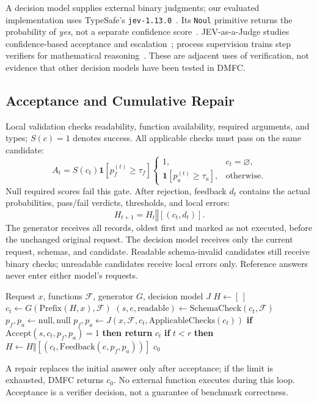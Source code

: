 A decision model supplies external binary judgments; our evaluated implementation uses TypeSafe's \texttt{jev-1.13.0}~\cite{typesafe2026models}. Its \texttt{Noul} primitive returns the probability of \emph{yes}, not a separate confidence score~\cite{typesafe2026noul,typesafe2026confidence}. JEV-as-a-Judge studies confidence-based acceptance and escalation~\cite{li2026jevjudge}; process supervision trains step verifiers for mathematical reasoning~\cite{lightman2023verify}. These are adjacent uses of verification, not evidence that other decision models have been tested in DMFC.

\subsection{Acceptance and Cumulative Repair}
Local validation checks readability, function availability, required arguments, and types; $S(c)=1$ denotes success. All applicable checks must pass on the same candidate:
\begin{equation}
A_t=S(c_t)\mathbf{1}[p_f^{(t)}\geq\tau_f]
\begin{cases}
1,&c_t=\varnothing,\\
\mathbf{1}[p_a^{(t)}\geq\tau_a],&\text{otherwise}.
\end{cases}
\label{eq:gate}
\end{equation}
Null required scores fail this gate. After rejection, feedback $d_t$ contains the actual probabilities, pass/fail verdicts, thresholds, and local errors:
\begin{equation}
H_{t+1}=H_t\mathbin{\Vert}[(c_t,d_t)].
\end{equation}
The generator receives all records, oldest first and marked as not executed, before the unchanged original request. The decision model receives only the current request, schemas, and candidate. Readable schema-invalid candidates still receive binary checks; unreadable candidates receive local errors only. Reference answers never enter either model's requests.

\begin{algorithm}[t]
\caption{\textbf{DMFC}: verification and cumulative repair}
\label{alg:jbfc}
\footnotesize
\begin{algorithmic}[1]
\Require Request $x$, functions $\mathcal{F}$, generator $G$, decision model $J$
\State $H\gets[\,]$
  \State $c_t\gets G(\mathrm{Prefix}(H,x),\mathcal{F})$
  \State $(s,e,\mathrm{readable})\gets\mathrm{SchemaCheck}(c_t,\mathcal{F})$
  \State $p_f,p_a\gets\mathrm{null},\mathrm{null}$
    \State $p_f,p_a\gets J(x,\mathcal{F},c_t,\mathrm{ApplicableChecks}(c_t))$
  \EndIf
  \State \textbf{if} $\mathrm{Accept}(s,c_t,p_f,p_a)=1$ \textbf{then return} $c_t$
  \State \textbf{if} $t<r$ \textbf{then} $H\gets H\Vert[(c_t,\mathrm{Feedback}(e,p_f,p_a))]$
\EndFor
\State \Return $c_0$
\end{algorithmic}
\end{algorithm}
A repair replaces the initial answer only after acceptance; if the limit is exhausted, DMFC returns $c_0$. No external function executes during this loop. Acceptance is a verifier decision, not a guarantee of benchmark correctness.
